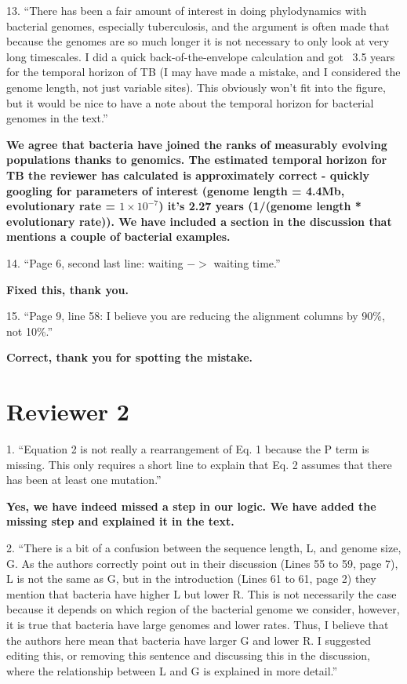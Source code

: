 \documentclass[11pt,oneside,letterpaper]{article}
\begin{document}
13. ``There has been a fair amount of interest in doing phylodynamics with bacterial genomes, especially tuberculosis, and the argument is often made that because the genomes are so much longer it is not necessary to only look at very long timescales. I did a quick back-of-the-envelope calculation and got ~3.5 years for the temporal horizon of TB (I may have made a mistake, and I considered the genome length, not just variable sites). This obviously won't fit into the figure, but it would be nice to have a note about the temporal horizon for bacterial genomes in the text.''

\textbf{We agree that bacteria have joined the ranks of measurably evolving populations thanks to genomics. The estimated temporal horizon for TB the reviewer has calculated is approximately correct - quickly googling for parameters of interest (genome length = 4.4Mb, evolutionary rate = $1\times10^{-7}$) it's 2.27 years (1/(genome length * evolutionary rate)). We have included a section in the discussion that mentions a couple of bacterial examples.}

14. ``Page 6, second last line: waiting $->$ waiting time.''

\textbf{Fixed this, thank you.}

15. ``Page 9, line 58: I believe you are reducing the alignment columns by 90\%, not 10\%.''

\textbf{Correct, thank you for spotting the mistake.}

\section*{Reviewer 2}

1. ``Equation 2 is not really a rearrangement of Eq. 1 because the P term is missing. This only requires a short line to explain that Eq. 2 assumes that there has been at least one mutation.''

\textbf{Yes, we have indeed missed a step in our logic. We have added the missing step and explained it in the text.}

2. ``There is a bit of a confusion between the sequence length, L, and genome size, G. As the authors correctly point out in their discussion (Lines 55 to 59, page 7), L is not the same as G, but in the introduction (Lines 61 to 61, page 2) they mention that bacteria have higher L but lower R. This is not necessarily the case because it depends on which region of the bacterial genome we consider, however, it is true that bacteria have large genomes and lower rates. Thus, I believe that the authors here mean that bacteria have larger G and lower R. I suggested editing this, or removing this sentence and discussing this in the discussion, where the relationship between L and G is explained in more detail.''
\end{document}
